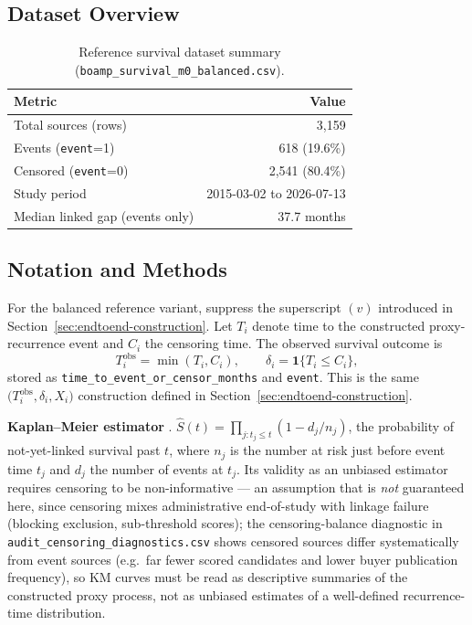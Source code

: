 \documentclass[11pt]{article}
\begin{document}
\subsection{Dataset Overview}
\begin{table}[h!]
\centering
\caption{Reference survival dataset summary
(\texttt{boamp\_survival\_m0\_balanced.csv}).}
\begin{tabular}{lr}
\toprule
Metric & Value \\
\midrule
Total sources (rows) & 3{,}159 \\
Events (\texttt{event}=1) & 618 (19.6\%) \\
Censored (\texttt{event}=0) & 2{,}541 (80.4\%) \\
Study period & 2015-03-02 to 2026-07-13 \\
Median linked gap (events only) & 37.7 months \\
\bottomrule
\end{tabular}
\end{table}

\subsection{Notation and Methods}
For the balanced reference variant, suppress the superscript $(v)$ introduced
in Section~\ref{sec:endtoend-construction}. Let $T_i$ denote time to the
constructed proxy-recurrence event and $C_i$ the censoring time. The observed
survival outcome is
\begin{equation}
T_i^{\mathrm{obs}}=\min(T_i,C_i),
\qquad
\delta_i=\mathbf{1}\{T_i\leq C_i\},
\end{equation}
stored as \texttt{time\_to\_event\_or\_censor\_months} and
\texttt{event}. This is the same $\bigl(T_i^{\mathrm{obs}},\delta_i,X_i\bigr)$
construction defined in Section~\ref{sec:endtoend-construction}.

\textbf{Kaplan--Meier estimator} \cite{kaplan1958}. $\hat S(t) =
\prod_{j:t_j\leq t}(1 - d_j/n_j)$, the probability of not-yet-linked
survival past $t$, where $n_j$ is the number at risk just before event time
$t_j$ and $d_j$ the number of events at $t_j$. Its validity as an unbiased
estimator requires censoring to be non-informative --- an assumption that
is \emph{not} guaranteed here, since censoring mixes administrative
end-of-study with linkage failure (blocking exclusion, sub-threshold
scores); the censoring-balance diagnostic in
\texttt{audit\_censoring\_diagnostics.csv} shows censored sources differ
systematically from event sources (e.g.\ far fewer scored candidates and
lower buyer publication frequency), so KM curves must be read as
descriptive summaries of the constructed proxy process, not as unbiased
estimates of a well-defined recurrence-time distribution.
\end{document}
